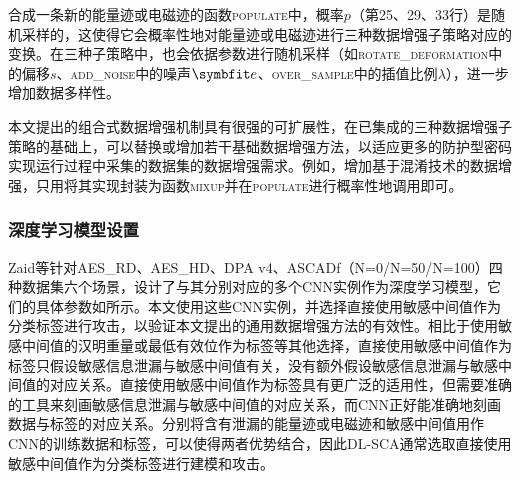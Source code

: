 {	合成一条新的能量迹或电磁迹的函数\textsc{populate}中，概率$p$（第25、29、33行）是随机采样的，这使得它会概率性地对能量迹或电磁迹进行三种数据增强子策略对应的变换。在三种子策略中，也会依据参数进行随机采样（如\textsc{rotate\_deformation}中的偏移$s$、\textsc{add\_noise}中的噪声$\Vector e$、\textsc{over\_sample}中的插值比例$\lambda$），进一步增加数据多样性。
	
	本文提出的组合式数据增强机制具有很强的可扩展性，在已集成的三种数据增强子策略的基础上，可以替换或增加若干基础数据增强方法，以适应更多的防护型密码实现运行过程中采集的数据集的数据增强需求。例如，增加基于混淆技术的数据增强，只用将其实现封装为函数\textsc{mixup}并在\textsc{populate}进行概率性地调用即可。
	\subsubsection{深度学习模型设置}
	Zaid等\citep{Zaid20}针对AES\_RD、AES\_HD、DPA v4、ASCADf（N=0/N=50/N=100）四种数据集六个场景，设计了与其分别对应的多个CNN实例作为深度学习模型，它们的具体参数如所示。本文使用这些CNN实例，并选择直接使用敏感中间值作为分类标签进行攻击，以验证本文提出的通用数据增强方法的有效性。相比于使用敏感中间值的汉明重量或最低有效位作为标签等其他选择，直接使用敏感中间值作为标签只假设敏感信息泄漏与敏感中间值有关，没有额外假设敏感信息泄漏与敏感中间值的对应关系。直接使用敏感中间值作为标签具有更广泛的适用性，但需要准确的工具来刻画敏感信息泄漏与敏感中间值的对应关系，而CNN正好能准确地刻画数据与标签的对应关系。分别将含有泄漏的能量迹或电磁迹和敏感中间值用作CNN的训练数据和标签，可以使得两者优势结合，因此DL-SCA通常选取直接使用敏感中间值作为分类标签进行建模和攻击。
	
}
